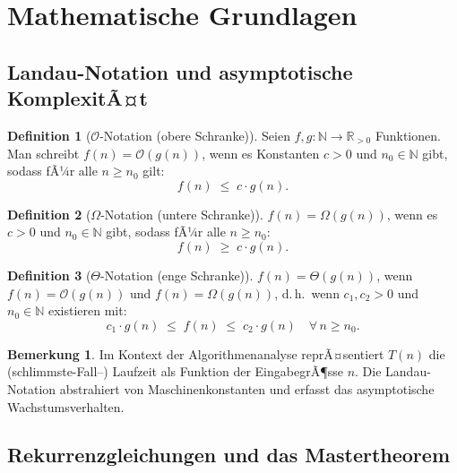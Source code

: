 ﻿\documentclass[a4paper,12pt]{article}
\theoremstyle{definition}
\newtheorem{definition}{Definition}
\newtheorem{bemerkung}{Bemerkung}
\begin{document}
\section{Mathematische Grundlagen}

\subsection{Landau-Notation und asymptotische KomplexitÃ¤t}

\begin{definition}[$\mathcal{O}$-Notation (obere Schranke)]
    Seien $f, g: \mathbb{N} \to \mathbb{R}_{>0}$ Funktionen. Man schreibt
    $f(n) = \mathcal{O}(g(n))$, wenn es Konstanten $c > 0$ und $n_0 \in \mathbb{N}$
    gibt, sodass fÃ¼r alle $n \geq n_0$ gilt:
    \[
        f(n) \;\leq\; c \cdot g(n).
    \]
\end{definition}

\begin{definition}[$\Omega$-Notation (untere Schranke)]
    $f(n) = \Omega(g(n))$, wenn es $c > 0$ und $n_0 \in \mathbb{N}$ gibt, sodass
    fÃ¼r alle $n \geq n_0$:
    \[
        f(n) \;\geq\; c \cdot g(n).
    \]
\end{definition}

\begin{definition}[$\Theta$-Notation (enge Schranke)]
    $f(n) = \Theta(g(n))$, wenn $f(n) = \mathcal{O}(g(n))$ und
    $f(n) = \Omega(g(n))$, d.\,h.\ wenn $c_1, c_2 > 0$ und $n_0 \in \mathbb{N}$
    existieren mit:
    \[
        c_1 \cdot g(n) \;\leq\; f(n) \;\leq\; c_2 \cdot g(n)
        \quad \forall\, n \geq n_0.
    \]
\end{definition}

\begin{bemerkung}
    Im Kontext der Algorithmenanalyse reprÃ¤sentiert $T(n)$ die (schlimmste-Fall--)
    Laufzeit als Funktion der EingabegrÃ¶sse $n$. Die Landau-Notation abstrahiert
    von Maschinenkonstanten und erfasst das asymptotische Wachstumsverhalten.
\end{bemerkung}

\subsection{Rekurrenzgleichungen und das Mastertheorem}
\end{document}
